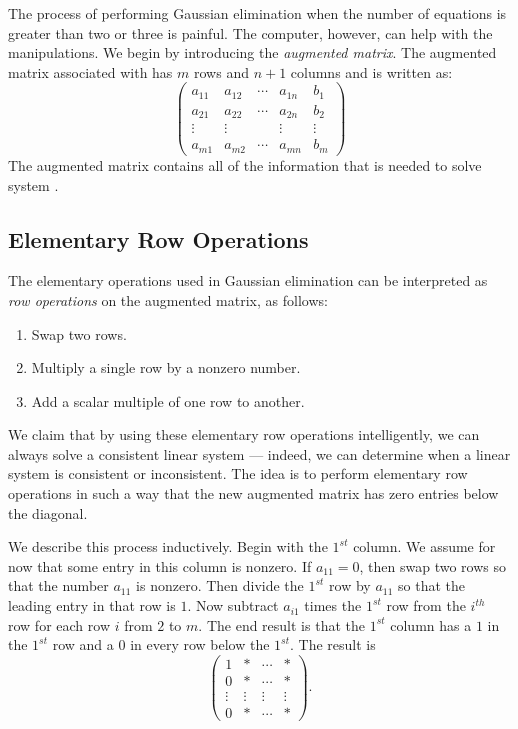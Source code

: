 The process of performing Gaussian elimination when the number
of equations is greater than two or three is painful.  The
computer, however, can help with the manipulations.  We begin by
introducing the {\em augmented matrix\/}. 
The augmented matrix associated with  has
$m$ rows and $n+1$ columns and is written as:
\begin{equation}  \label{augmented}
\left(
\begin{array}{rrrr|r}
 a_{11} & a_{12} & \cdots & a_{1n} &  b_1 \\
 a_{21} & a_{22} & \cdots & a_{2n} &  b_2 \\
 \vdots & \vdots &        & \vdots & \vdots \\
 a_{m1} & a_{m2} & \cdots & a_{mn} &  b_m
\end{array}
\right)
\end{equation}
The augmented matrix contains all of the information that is
needed to solve system .

\subsection*{Elementary Row Operations} 

The elementary operations used in Gaussian elimination
can be interpreted as {\em row operations\/} on
the augmented matrix, as follows:
\begin{enumerate}
\item   Swap two rows.
\item   Multiply a single row by a nonzero number.
\item   Add a scalar multiple of one row to another.
\end{enumerate}
We claim that by using these elementary row operations
intelligently, we can always solve a consistent linear system
--- indeed, we can determine when a linear system is consistent
or inconsistent.  The idea is to perform elementary row
operations in such a way that the new augmented matrix has zero
entries below the diagonal.

We describe this process inductively.  Begin with the $1^{st}$
column.  We assume for now that some entry in this column is
nonzero.  If $a_{11}=0$, then swap two rows so that the
number $a_{11}$ is nonzero.  Then divide the $1^{st}$ row by
$a_{11}$ so that the leading entry in that row is $1$.  Now
subtract $a_{i1}$ times the $1^{st}$ row from the $i^{th}$ row
for each row $i$ from $2$ to $m$.  The end result is that the
$1^{st}$ column has a $1$ in the $1^{st}$ row and a $0$ in every
row below the $1^{st}$.  The result is
\[
\left(\begin{array}{cccc}  1 & * & \cdots & * \\
0 & * & \cdots & * \\ \vdots & \vdots & \vdots & \vdots \\
0 & * & \cdots & * \end{array} \right).
\]


